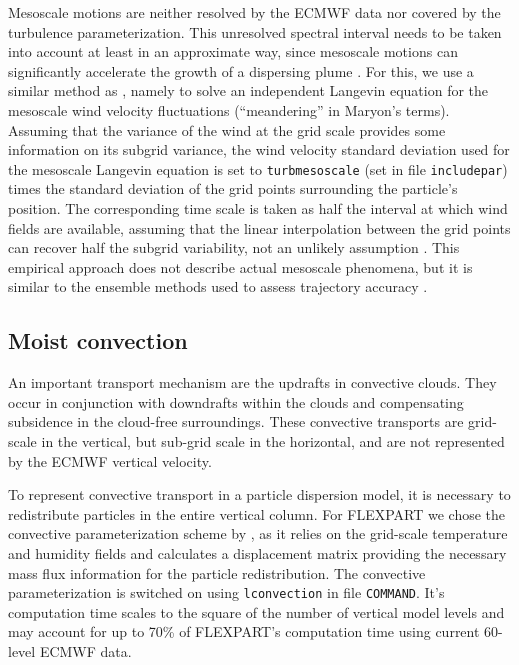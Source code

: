 \documentclass{egu}                  %
\begin{document}
Mesoscale motions are neither resolved by the ECMWF data nor covered by the
turbulence parameterization.  This unresolved spectral interval needs to be
taken into account at least in an approximate way, since mesoscale motions can
significantly accelerate the growth of a dispersing plume \citep{gupta1997}.
For this, we use a similar method as \citet{maryon1998}, namely to solve an
independent Langevin equation for the mesoscale wind velocity fluctuations
(``meandering'' in Maryon's terms).  Assuming that the variance of the wind at
the grid scale provides some information on its subgrid variance, the wind
velocity standard deviation used for the mesoscale Langevin equation is set to
\verb|turbmesoscale| (set in file \verb|includepar|) times the standard
deviation of the grid points surrounding the particle's position.  The
corresponding time scale is taken as half the interval at which wind fields are
available, assuming that the linear interpolation between the grid points can
recover half the subgrid variability, not an unlikely assumption
\citep{stohl1995}.  This empirical approach does not describe actual mesoscale
phenomena, but it is similar to the ensemble methods used to assess trajectory
accuracy \citep{kahl1996, baumann1997, stohl1998}.

\subsection{Moist convection}

An important transport mechanism are the updrafts in convective clouds.  They
occur in conjunction with downdrafts within the clouds and compensating
subsidence in the cloud-free surroundings.  These convective transports are
grid-scale in the vertical, but sub-grid scale in the horizontal, and are not
represented by the ECMWF vertical velocity.

To represent convective transport in a particle dispersion model, it is
necessary to redistribute particles in the entire vertical column.  For
FLEXPART we chose the convective parameterization scheme by
\citet{emanuel1999}, as it relies on the grid-scale temperature and humidity
fields and calculates a displacement matrix providing the necessary mass flux
information for the particle redistribution.  The convective parameterization
is switched on using \verb|lconvection| in file \verb|COMMAND|.  It's
computation time scales to the square of the number of vertical model levels
and may account for up to 70\% of FLEXPART's computation time using current
60-level ECMWF data.
\end{document}
